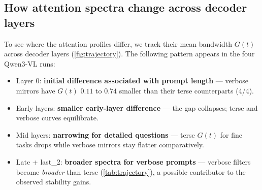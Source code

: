 \documentclass[10pt,twocolumn,letterpaper]{article}
\newcommand{\Gt}{G(t)}
\begin{document}


\subsection{How attention spectra change across decoder layers}
\label{sec:results-trajectory}

To see where the attention profiles differ, we track their mean bandwidth $\Gt$ across decoder layers (\cref{fig:trajectory}). The following pattern appears in the four Qwen3-VL runs:
% 
\begin{itemize}[leftmargin=1.4em,itemsep=2pt]
% 
    \item Layer 0: \textbf{initial difference associated with prompt length} --- verbose mirrors have $\Gt$ $0.11$ to $0.74$ smaller than their terse counterparts (4/4).
    \item Early layers: \textbf{smaller early-layer difference} --- the gap collapses; terse and verbose curves equilibrate.
    \item Mid layers: \textbf{narrowing for detailed questions} --- terse $\Gt$ for fine tasks drops while verbose mirrors stay flatter comparatively.
    \item Late + last\_2: \textbf{broader spectra for verbose prompts} --- verbose filters become \emph{broader} than terse (\cref{tab:trajectory}), a possible contributor to the observed stability gains.
\end{itemize}
% 
% 
\end{document}
